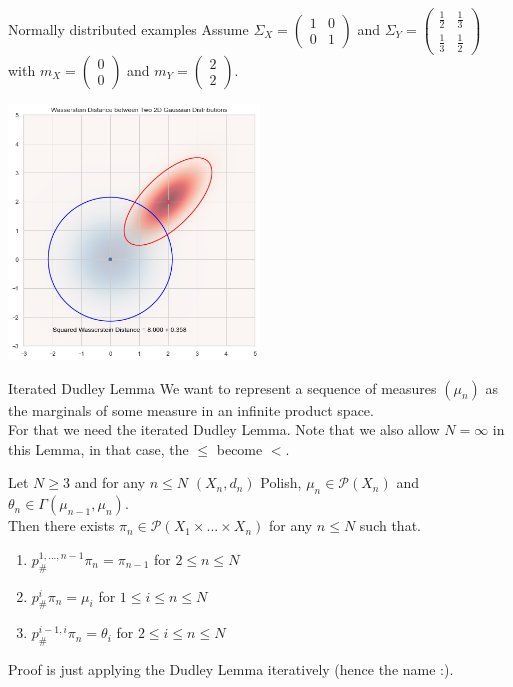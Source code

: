\documentclass[10pt]{beamer}
\theoremstyle{reminder}
\begin{document}
\begin{frame}{Normally distributed examples}
    Assume $\Sigma_X = \begin{pmatrix}1 & 0 \\ 0 & 1\end{pmatrix}$ and $\Sigma_Y = \begin{pmatrix}\frac{1}{2} & \frac{1}{3} \\ \frac{1}{3} & \frac{1}{2} \end{pmatrix}$ 
with $m_X = \begin{pmatrix}0 \\ 0 \end{pmatrix}$ and $m_Y = \begin{pmatrix}2 \\ 2 \end{pmatrix}$. 
\begin{center}
    \includegraphics[width=0.5\textwidth]{images/Wasserstein.png}  
\end{center}
\end{frame}



\begin{frame}{Iterated Dudley Lemma}
    We want to represent a sequence of measures $(\mu_n)$ as the marginals of some measure in an infinite product space. \\ 
    \vspace{0.5cm}
    For that we need the iterated Dudley Lemma. Note that we also allow $N = \infty$ in this Lemma, in that case, the $\leq$ become $<$.
    \begin{lemma}
        Let $N \geq 3$ and for any $n \leq N$ $(X_n,d_n)$ Polish, $\mu_n \in \mathcal{P}(X_n)$ and $\theta_n \in \Gamma(\mu_{n-1},\mu_n)$. \\ 
        Then there exists $\pi_n \in \mathcal{P}(X_1\times ... \times X_n)$ for any $n \leq N$ such that.
        \begin{enumerate}
            \item $p^{1,...,n-1}_{\#} \pi_n = \pi_{n-1}$ for $2 \leq n \leq N$
            \item $p^i_{\#} \pi_n = \mu_i$ for $1 \leq i \leq n \leq N$
            \item $p^{i-1,i}_{\#} \pi_n = \theta_i$ for $2 \leq i\leq n \leq N$
        \end{enumerate}
    \end{lemma}
    Proof is just applying the Dudley Lemma iteratively (hence the name :).
\end{frame}
\end{document}
